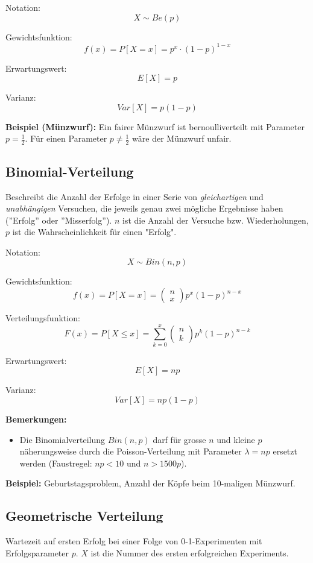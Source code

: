 \documentclass[10pt,a4paper,twocolumn]{article}
\begin{document}
\vspace{10pt}

Notation:
\[
X \sim Be(p)
\]

Gewichtsfunktion:
\[
f(x)=P[X=x]=p^x\cdot (1-p)^{1-x}
\]

Erwartungswert:
\[
E[X]=p
\]

Varianz:
\[
Var[X]=p(1-p)
\]

\textbf{Beispiel (Münzwurf):} Ein fairer Münzwurf ist bernoulliverteilt mit Parameter $p=\frac{1}{2}$. Für einen Parameter $p\neq\frac{1}{2}$ wäre der Münzwurf unfair.

\subsection{Binomial-Verteilung}
Beschreibt die Anzahl der Erfolge in einer Serie von \emph{gleichartigen} und \emph{unabhängigen} Versuchen, die jeweils genau zwei mögliche Ergebnisse haben (''Erfolg'' oder ''Misserfolg''). $n$ ist die Anzahl der Versuche bzw. Wiederholungen, $p$ ist die Wahrscheinlichkeit für einen "Erfolg".

\vspace{10pt}

Notation:
\[
X \sim Bin(n,p)
\]

Gewichtsfunktion:
\[
f(x)=P[X=x]=
\left(
	\begin{array}{c}
		n \\
		x
	\end{array}
\right)
p^x(1-p)^{n-x}
\]

Verteilungsfunktion:
\[
F(x)=P[X \leq x]=\sum \limits_{k=0}^x 
\left(
	\begin{array}{c}
		n \\
		k
	\end{array}
\right)
p^k(1-p)^{n-k}
\]

Erwartungswert:
\[
E[X]=np
\]

Varianz:
\[
Var[X]=np(1-p)
\]

\textbf{Bemerkungen:}
\begin{itemize}
\item Die Binomialverteilung $Bin(n,p)$ darf für grosse $n$ und kleine $p$ näherungsweise durch die Poisson-Verteilung mit Parameter $\lambda = np$ ersetzt werden (Faustregel: $np<10$ und $n>1500p$).
\end{itemize}

\textbf{Beispiel:} Geburtstagsproblem, Anzahl der Köpfe beim 10-maligen Münzwurf.

\subsection{Geometrische Verteilung}
Wartezeit auf ersten Erfolg bei einer Folge von 0-1-Experimenten mit Erfolgsparameter $p$. $X$ ist die Nummer des ersten erfolgreichen Experiments.
\end{document}
